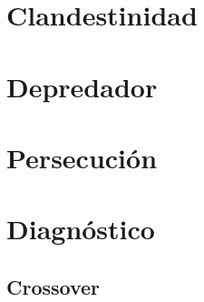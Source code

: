 \documentclass[11pt,a5paper]{book}
\begin{document}
\chapter{Clandestinidad}\label{chapter:clandestinidad}


\chapter{Depredador}\label{chapter:depredador}


\chapter{Persecución}\label{chapter:persecucion}


\chapter{Diagnóstico}\label{chapter:diagnostico}


\begin{appendices}
\renewcommand{\thechapter}{\arabic{chapter}}
\chapter{Crossover}\label{appendix:crossover}

\end{appendices}
\end{document}
